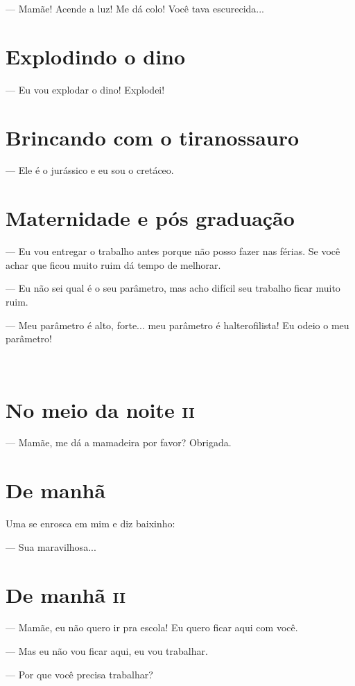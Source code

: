 — Mamãe! Acende a luz! Me dá colo! Você tava escurecida...

\chapter{Explodindo o dino}

— Eu vou explodar o dino! Explodei!

\chapter{Brincando com o tiranossauro}

— Ele é o jurássico e eu sou o cretáceo.

\chapter{Maternidade e pós graduação}

— Eu vou entregar o trabalho antes porque não posso fazer nas férias. Se
você achar que ficou muito ruim dá tempo de melhorar.

— Eu não sei qual é o seu parâmetro, mas acho difícil seu trabalho ficar
muito ruim.

— Meu parâmetro é alto, forte... meu parâmetro é halterofilista! Eu
odeio o meu parâmetro!

 

\chapter{No meio da noite \textsc{ii}}

— Mamãe, me dá a mamadeira por favor? Obrigada.

\chapter{De manhã}

Uma se enrosca em mim e diz baixinho:

— Sua maravilhosa...

\chapter{De manhã \textsc{ii}}

— Mamãe, eu não quero ir pra escola! Eu quero ficar aqui com você.

— Mas eu não vou ficar aqui, eu vou trabalhar.

— Por que você precisa trabalhar?

